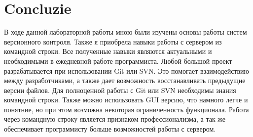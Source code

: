 \section*{Concluzie}

В ходе данной лабораторной работы мною были изучены основы работы систем версионного контроля. Также я приобрела навыки работы с сервером из командной строки. Все полученные навыки являются актуальными и необходимыми в ежедневной работе программиста. Любой большой проект разрабатывается при использовании Git или SVN. Это помогает взаимодействию между разработчиками, а также дает возможность восстанавливать предыдущие версии файлов. Для полноценной работы с Git или SVN необходимы знания командной строки. Также можно использовать GUI версию, что намного легче и понятние, но при этом возможна некоторая ограниченность функционала. Работа через командную строку является признаком профессионализма, а так же обеспечивает программисту больше возможностей работы с сервером.

\clearpage